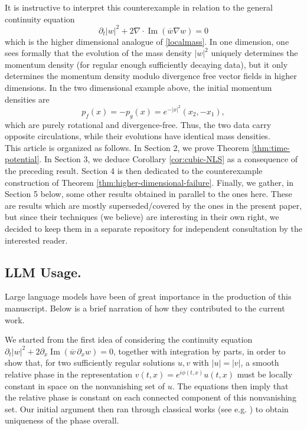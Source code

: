 \documentclass[11pt]{amsart}
\theoremstyle{remark}
\newcommand{\1}{\mathbf 1}
\begin{document}
It is instructive to interpret this counterexample in relation to the general continuity equation
\begin{equation*}
\partial_t|w|^2+2\nabla\cdot \operatorname{Im}(\overline{w}\nabla w)=0  
\end{equation*}
which is the higher dimensional analogue of \eqref{localmass}. In one dimension, one sees formally that the evolution of the mass density $|w|^2$ uniquely determines the momentum density (for regular enough sufficiently decaying data), but it only determines the momentum density modulo divergence free vector fields in higher dimensions. In the two dimensional example above, the initial momentum densities are
\[
p_f(x)=-p_g(x)=e^{-|x|^2}(x_2,-x_1),
\]
which are purely rotational and divergence-free. Thus, the two data carry
opposite circulations, while their evolutions have identical mass densities.
\\

This article is organized as follows. In Section 2, we prove Theorem \ref{thm:time-potential}. In Section 3, we deduce Corollary \ref{cor:cubic-NLS} as a consequence of the preceding result. Section 4 is then dedicated to the counterexample construction of Theorem \ref{thm:higher-dimensional-failure}. Finally, we gather, in Section 5 below, some other results obtained in parallel to the ones here. These are results which are mostly superseded/covered by the ones in the present paper, but since their techniques (we believe) are interesting in their own right, we decided to keep them in a separate repository for independent consultation by the interested reader.

\subsection*{LLM Usage.} Large language models have been of great importance in the production of this manuscript. Below is a brief narration of how they contributed to the current work. 

We started from the first idea of considering the continuity equation $ \partial_t|w|^2+2\partial_x\operatorname{Im}(\overline w\,\partial_xw)=0$, together with integration by parts, in order to show that, for two sufficiently regular solutions $u,v$ with $|u|=|v|$, a smooth relative phase in the representation $v(t,x)=e^{i\phi(t,x)}u(t,x)$ must be locally constant in space on the nonvanishing set of $u$. The equations then imply that the relative phase is constant on each connected component of this nonvanishing set. Our initial argument then ran through classical works (see e.g. \cite{Masuda}) to obtain uniqueness of the phase overall.
\end{document}
